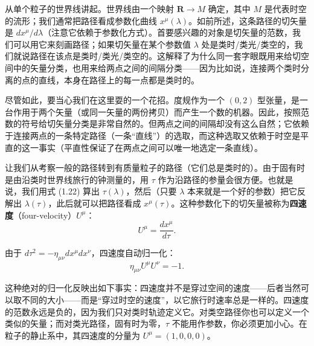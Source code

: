 从单个粒子的世界线讲起。世界线由一个映射 $\mathbf{R}\to M$ 确定，其中 $M$ 是代表时空的流形；我们通常把路径看成参数化曲线 $x^{\mu}(\lambda)$。如前所述，这条路径的切矢量是 $dx^{\mu}/d\lambda$（注意它依赖于参数化方式）。首要感兴趣的对象是切矢量的范数，我们可以用它来刻画路径；如果切矢量在某个参数值 $\lambda$ 处是类时/类光/类空的，我们就说路径在该点是类时/类光/类空的。这解释了为什么同一套字眼既用来给切空间中的矢量分类，也用来给两点之间的间隔分类——因为比如说，连接两个类时分离的点的直线，本身在路径上的每一点都是类时的。

尽管如此，要当心我们在这里耍的一个花招。度规作为一个 $(0,2)$ 型张量，是一台作用于两个矢量（或同一矢量的两份拷贝）而产生一个数的机器。因此，按照范数的符号给切矢量分类是非常自然的。但两点之间的间隔却没有这么自然；它依赖于连接两点的一条特定路径（一条“直线”）的选取，而这种选取又依赖于时空是平直的这一事实（平直性保证了在两点之间可以唯一地选定一条直线）。

让我们从考察一般的路径转到有质量粒子的路径（它们总是类时的）。由于固有时是由沿类时世界线旅行的钟测量的，用 $\tau$ 作为沿路径的参量会很方便。也就是说，我们用式 (1.22) 算出 $\tau(\lambda)$，然后（只要 $\lambda$ 本来就是一个好的参数）把它反解出 $\lambda(\tau)$，此后就可以把路径看成 $x^{\mu}(\tau)$。这种参数化下的切矢量被称为\textbf{四速度}（four-velocity）$U^{\mu}$：
\begin{equation*}
\boxed{U^{\mu} = \frac{dx^{\mu}}{d\tau}.}
\tag{1.99}
\end{equation*}

由于 $d\tau^2 = -\eta_{\mu\nu}dx^{\mu}dx^{\nu}$，四速度自动归一化：
\begin{equation*}
\eta_{\mu\nu}U^{\mu}U^{\nu} = -1.
\tag{1.100}
\end{equation*}

这种绝对的归一化反映出如下事实：四速度并不是穿过空间的速度——后者当然可以取不同的大小——而是“穿过时空的速度”，以它旅行时速率总是一样的。四速度的范数永远是负的，因为我们只对类时轨迹定义它。对类空路径你也可以定义一个类似的矢量；而对类光路径，固有时为零，$\tau$ 不能用作参数，你必须更加小心。在粒子的静止系中，其四速度的分量为 $U^{\mu}=(1,0,0,0)$。

